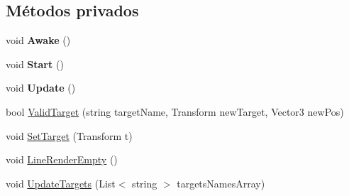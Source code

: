 \subsection*{Métodos privados}
\begin{DoxyCompactItemize}
\item 
\mbox{\label{class_game_controller_a1dfa0b843c71b7013f101e200613e8b5}} 
void {\bfseries Awake} ()
\item 
\mbox{\label{class_game_controller_a97788a7aa0f09c8d748781683e5f045b}} 
void {\bfseries Start} ()
\item 
\mbox{\label{class_game_controller_a5a89277529cadb49af7d55eba3bbf056}} 
void {\bfseries Update} ()
\item 
bool \mbox{\hyperlink{class_game_controller_a039a7e414b2f588ad0fb6e907146c84c}{Valid\+Target}} (string target\+Name, Transform new\+Target, Vector3 new\+Pos)
\item 
void \mbox{\hyperlink{class_game_controller_af33ac3595c0cdcd615cf63738638482f}{Set\+Target}} (Transform t)
\item 
void \mbox{\hyperlink{class_game_controller_a4156d664c9b3dce275af61bff2c00a69}{Line\+Render\+Empty}} ()
\item 
void \mbox{\hyperlink{class_game_controller_a0faec72a151b40bb1a13340f89a735aa}{Update\+Targets}} (List$<$ string $>$ targets\+Names\+Array)
\end{DoxyCompactItemize}
